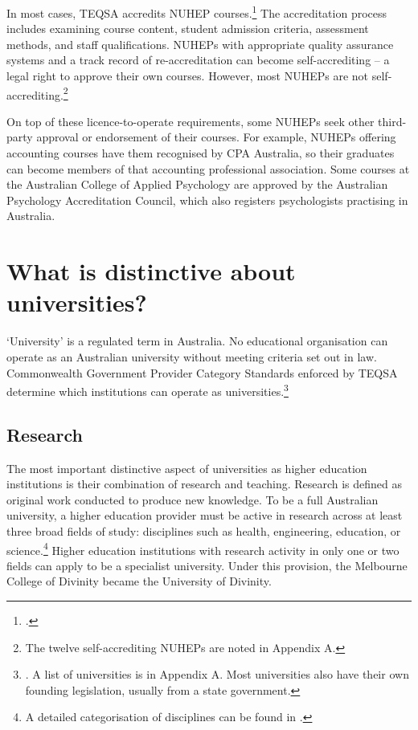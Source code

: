 \documentclass{grattan}
\begin{document}
In most cases, TEQSA accredits NUHEP courses.\footcite[][]{TEQSA2017providerregistrati} The accreditation process includes examining course content, student admission criteria, assessment methods, and staff qualifications. NUHEPs with appropriate quality assurance systems and a track record of re-accreditation can become self-accrediting -- a legal right to approve their own courses. However, most NUHEPs are not self-accrediting.\footnote{The twelve self-accrediting NUHEPs are noted in Appendix A.}

On top of these licence-to-operate requirements, some NUHEPs seek other third-party approval or endorsement of their courses. For example, NUHEPs offering accounting courses have them recognised by CPA Australia, so their graduates can become members of that accounting professional association. Some courses at the Australian College of Applied Psychology are approved by the Australian Psychology Accreditation Council, which also registers psychologists practising in Australia.

%
\section{What is distinctive about universities?}\label{sec:what-is-distinctive-about-universities}

`University' is a regulated term in Australia. No educational organisation can operate as an Australian university without meeting criteria set out in law. Commonwealth Government Provider Category Standards enforced by TEQSA determine which institutions can operate as universities.\footnote{\textcite[][]{DepartmentofEducationandTraining2015highereducationre}. A list of universities is in Appendix A. Most universities also have their own founding legislation, usually from a state government.}

%
\subsection{Research}\label{subsec:research}

The most important distinctive aspect of universities as higher education institutions is their combination of research and teaching. Research is defined as original work conducted to produce new knowledge. To be a full Australian university, a higher education provider must be active in research across at least three broad fields of study: disciplines such as health, engineering, education, or science.\footnote{A detailed categorisation of disciplines can be found in \textcite[][]{ABS2001australianstandard}.} Higher education institutions with research activity in only one or two fields can apply to be a specialist university. Under this provision, the Melbourne College of Divinity became the University of Divinity.
\end{document}
